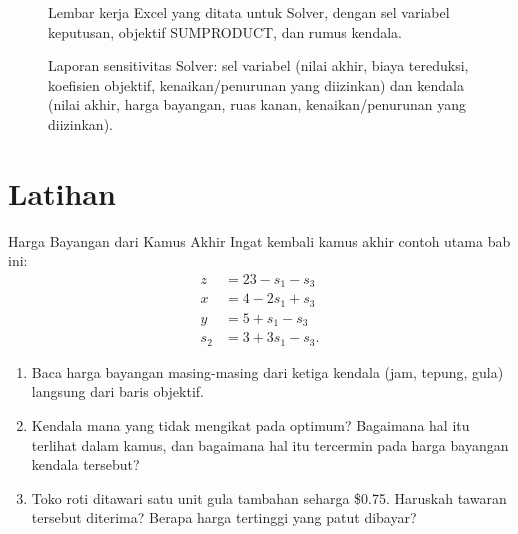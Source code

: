 \begin{figure}[h!]
\centering
{}
\caption{Lembar kerja Excel yang ditata untuk Solver, dengan sel variabel keputusan, objektif SUMPRODUCT, dan rumus kendala.}
\label{fig:excel-setup}
\end{figure}

\begin{figure}[h!]
\centering
{}
\caption{Laporan sensitivitas Solver: sel variabel (nilai akhir, biaya tereduksi, koefisien objektif, kenaikan/penurunan yang diizinkan) dan kendala (nilai akhir, harga bayangan, ruas kanan, kenaikan/penurunan yang diizinkan).}
\label{fig:excel-sensitivity-report}
\end{figure}

\section{Latihan}


\begin{ex}{Harga Bayangan dari Kamus Akhir}{}
 Ingat kembali kamus akhir contoh utama bab ini:
\[
\begin{aligned}
z &= 23 - s_1 - s_3 \\
x &= 4 - 2s_1 + s_3 \\
y &= 5 + s_1 - s_3 \\
s_2 &= 3 + 3s_1 - s_3.
\end{aligned}
\]
\begin{enumerate}
\item Baca harga bayangan masing-masing dari ketiga kendala (jam, tepung, gula) langsung dari baris objektif.
\item Kendala mana yang tidak mengikat pada optimum? Bagaimana hal itu terlihat dalam kamus, dan bagaimana hal itu tercermin pada harga bayangan kendala tersebut?
\item Toko roti ditawari satu unit gula tambahan seharga \$0.75. Haruskah tawaran tersebut diterima? Berapa harga tertinggi yang patut dibayar?
\end{enumerate}
\exrefs{\S\ref{sec:sensitivity-rhs}}
\end{ex}

